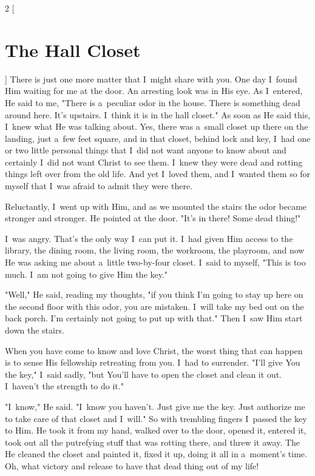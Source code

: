 \documentclass[a4paper,12pt]{article}
\begin{document}
\begin{multicols}{2}
    [
\section*{The Hall Closet}
    ]
There is just one more matter that I~might share with you. One day I~found Him waiting for me at the door. An arresting look was in His eye. As I~entered, He said to me, "There is a~peculiar odor in the house. There is something dead around here. It's upstairs. I~think it is in the hall closet." As soon as He said this, I~knew what He was talking about. Yes, there was a~small closet up there on the landing, just a~few feet square, and in that closet, behind lock and key, I~had one or two little personal things that I~did not want anyone to know about and certainly I~did not want Christ to see them. I~knew they were dead and rotting things left over from the old life. And yet I~loved them, and I~wanted them so for myself that I~was afraid to admit they were there. 

Reluctantly, I~went up with Him, and as we mounted the stairs the odor became stronger and stronger. He pointed at the door. "It's in there! Some dead thing!" 

I~was angry. That's the only way I~can put it. I~had given Him access to the library, the dining room, the living room, the workroom, the playroom, and now He was asking me about a~little two-by-four closet. I~said to myself, "This is too much. I~am not going to give Him the key." 

"Well," He said, reading my thoughts, "if you think I'm going to stay up here on the second floor with this odor, you are mistaken. I~will take my bed out on the back porch. I'm certainly not going to put up with that." Then I~saw Him start down the stairs. 

When you have come to know and love Christ, the worst thing that can happen is to sense His fellowship retreating from you. I~had to surrender. "I'll give You the key," I~said sadly, "but You'll have to open the closet and clean it out. I~haven't the strength to do it." 

"I~know," He said. "I~know you haven't. Just give me the key. Just authorize me to take care of that closet and I~will." So with trembling fingers I~passed the key to Him. He took it from my hand, walked over to the door, opened it, entered it, took out all the putrefying stuff that was rotting there, and threw it away. The He cleaned the closet and painted it, fixed it up, doing it all in a~moment's time. Oh, what victory and release to have that dead thing out of my life! 
\end{multicols}
\end{document}
